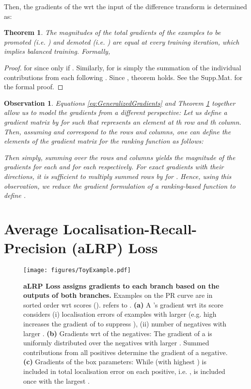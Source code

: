 \documentclass{article}
\newtheorem{theorem}{Theorem}
\newtheorem{observation}{Observation}
\begin{document}
{Then, the gradients of the  wrt the input of the difference transform is determined as: 


\begin{theorem} 
\label{theorem:BalancedTraining}
The magnitudes of the total gradients of the examples to be promoted (i.e. ) and demoted (i.e. ) are equal at every training iteration, which implies balanced training. Formally,

\end{theorem}
\begin{proof}
 for  since  only if . Similarly,  for  is simply the summation of the individual contributions from each  following . Since , theorem holds. See the Supp.Mat. for the formal proof.
\end{proof}
\begin{observation}
\label{observation:GradMatrix}
Equations \ref{eq:GeneralizedGradients} and Theorem \ref{theorem:BalancedTraining} together allow us to model the gradients from a different perspective: Let us define a gradient matrix by  for  such that  represents an element at th row and th column. Then, assuming  and  correspond to the rows and columns, one can define the elements of the gradient matrix for the ranking function  as follows:

Then simply, summing over the rows and columns yields the magnitude of the gradients for each  and for each  respectively. For exact gradients with their directions, it is sufficient to multiply summed rows by  for . Hence, using this observation, we reduce the gradient formulation of a ranking-based function  to define .
\end{observation}
} \section{Average Localisation-Recall-Precision (aLRP) Loss}
\label{sec:aLRPLoss}

\begin{figure}[t]
    \centerline{
        \texttt{[image: figures/ToyExample.pdf]}
    }
    \caption{\textbf{aLRP Loss assigns gradients to each branch based on the outputs of both branches.} Examples on the PR curve are in sorted order wrt scores ().  refers to . \textbf{(a)} A 's gradient wrt its score considers (i) localisation errors of  examples with larger  (e.g. high  increases the gradient of  to suppress  ), (ii) number of negatives with larger . \textbf{(b)} Gradients wrt  of the negatives: The gradient of a  is uniformly distributed over the negatives with larger . Summed  contributions from all positives determine the gradient of a negative. \textbf{(c)} Gradients of the box parameters: While  (with highest ) is included in total localisation error on each positive, i.e. ,   is included once with the largest .
    \label{fig:ToyExample}
} 
\end{figure}
\end{document}
